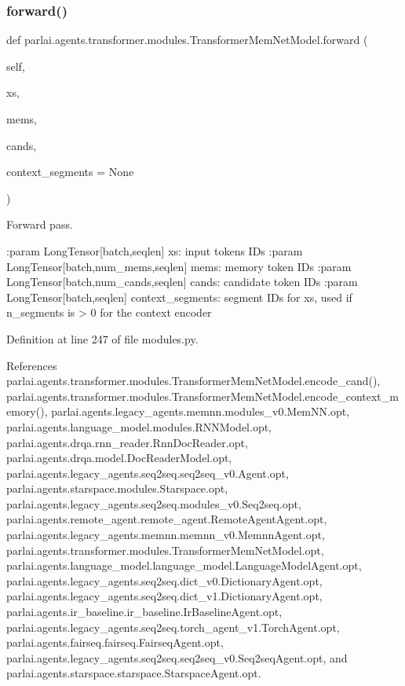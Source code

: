\subsubsection{\texorpdfstring{forward()}{forward()}}
{\footnotesize\ttfamily def parlai.\+agents.\+transformer.\+modules.\+Transformer\+Mem\+Net\+Model.\+forward (\begin{DoxyParamCaption}\item[{}]{self,  }\item[{}]{xs,  }\item[{}]{mems,  }\item[{}]{cands,  }\item[{}]{context\+\_\+segments = {\ttfamily None} }\end{DoxyParamCaption})}

\begin{DoxyVerb}Forward pass.

:param LongTensor[batch,seqlen] xs: input tokens IDs
:param LongTensor[batch,num_mems,seqlen] mems: memory token IDs
:param LongTensor[batch,num_cands,seqlen] cands: candidate token IDs
:param LongTensor[batch,seqlen] context_segments: segment IDs for xs,
    used if n_segments is > 0 for the context encoder
\end{DoxyVerb}
 

Definition at line 247 of file modules.\+py.



References parlai.\+agents.\+transformer.\+modules.\+Transformer\+Mem\+Net\+Model.\+encode\+\_\+cand(), parlai.\+agents.\+transformer.\+modules.\+Transformer\+Mem\+Net\+Model.\+encode\+\_\+context\+\_\+memory(), parlai.\+agents.\+legacy\+\_\+agents.\+memnn.\+modules\+\_\+v0.\+Mem\+N\+N.\+opt, parlai.\+agents.\+language\+\_\+model.\+modules.\+R\+N\+N\+Model.\+opt, parlai.\+agents.\+drqa.\+rnn\+\_\+reader.\+Rnn\+Doc\+Reader.\+opt, parlai.\+agents.\+drqa.\+model.\+Doc\+Reader\+Model.\+opt, parlai.\+agents.\+legacy\+\_\+agents.\+seq2seq.\+seq2seq\+\_\+v0.\+Agent.\+opt, parlai.\+agents.\+starspace.\+modules.\+Starspace.\+opt, parlai.\+agents.\+legacy\+\_\+agents.\+seq2seq.\+modules\+\_\+v0.\+Seq2seq.\+opt, parlai.\+agents.\+remote\+\_\+agent.\+remote\+\_\+agent.\+Remote\+Agent\+Agent.\+opt, parlai.\+agents.\+legacy\+\_\+agents.\+memnn.\+memnn\+\_\+v0.\+Memnn\+Agent.\+opt, parlai.\+agents.\+transformer.\+modules.\+Transformer\+Mem\+Net\+Model.\+opt, parlai.\+agents.\+language\+\_\+model.\+language\+\_\+model.\+Language\+Model\+Agent.\+opt, parlai.\+agents.\+legacy\+\_\+agents.\+seq2seq.\+dict\+\_\+v0.\+Dictionary\+Agent.\+opt, parlai.\+agents.\+legacy\+\_\+agents.\+seq2seq.\+dict\+\_\+v1.\+Dictionary\+Agent.\+opt, parlai.\+agents.\+ir\+\_\+baseline.\+ir\+\_\+baseline.\+Ir\+Baseline\+Agent.\+opt, parlai.\+agents.\+legacy\+\_\+agents.\+seq2seq.\+torch\+\_\+agent\+\_\+v1.\+Torch\+Agent.\+opt, parlai.\+agents.\+fairseq.\+fairseq.\+Fairseq\+Agent.\+opt, parlai.\+agents.\+legacy\+\_\+agents.\+seq2seq.\+seq2seq\+\_\+v0.\+Seq2seq\+Agent.\+opt, and parlai.\+agents.\+starspace.\+starspace.\+Starspace\+Agent.\+opt.



